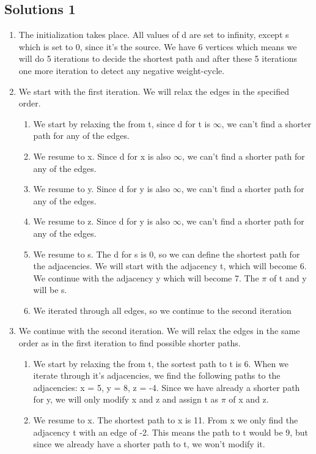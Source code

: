 \documentclass{article}
\begin{document}
\subsection*{Solutions 1}
\begin{enumerate}
    \item The initialization takes place. All values of d are set to infinity, except s which is set to 0, since it's the source. We have 6 vertices which means we will do 5 iterations to decide the shortest path and after these 5 iterations one more iteration to detect any negative weight-cycle.
    \item We start with the first iteration. We will relax the edges in the specified order.
        \begin{enumerate}[label=(\roman*)]
            \item We start by relaxing the from t, since d for t is $\infty$, we can't find a shorter path for any of the edges.
            \item We resume to x. Since d for x is also $\infty$, we can't find a shorter path for any of the edges.
            \item We resume to y. Since d for y is also $\infty$, we can't find a shorter path for any of the edges.
            \item We resume to z. Since d for y is also $\infty$, we can't find a shorter path for any of the edges.
            \item We resume to s. The d for s is 0, so we can define the shortest path for the adjacencies. We will start with the adjacency t, which will become 6. We continue with the adjacency y which will become 7. The $\pi$ of t and y will be s.
            \item We iterated through all edges, so we continue to the second iteration
        \end{enumerate}
    \item We continue with the second iteration. We will relax the edges in the same order as in the first iteration to find possible shorter paths.
        \begin{enumerate}[label=(\roman*)]
            \item We start by relaxing the from t, the sortest path to t is 6. When we iterate through it's adjacencies, we find the following paths to the adjacencies: x = 5, y = 8, z = -4. Since we have already a shorter path for y, we will only modify x and z and assign t as $\pi$ of x and z.
            \item We resume to x. The shortest path to x is 11. From x we only find the adjacency t with an edge of -2. This means the path to t would be 9, but since we already have a shorter path to t, we won't modify it.

\end{enumerate}
\end{enumerate}
\end{document}
